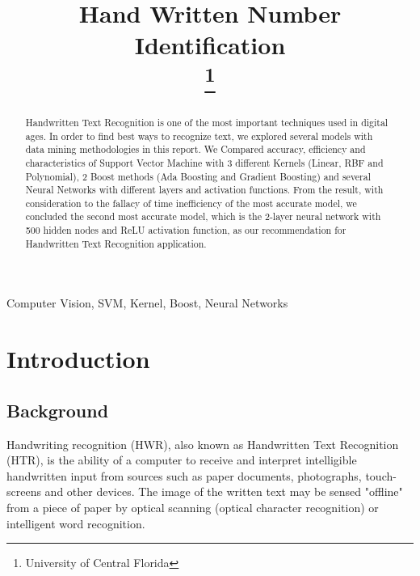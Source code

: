 \documentclass[conference]{IEEEtran}
\begin{document}
\title{Hand Written Number Identification\\
\thanks{University of Central Florida}
}

\author{
}

\maketitle
\thispagestyle{plain}
\pagestyle{plain}

\begin{abstract}
Handwritten Text Recognition is one of the most important techniques used in digital ages. In order to find best ways to recognize text, we explored several models with data mining methodologies in this report. We Compared accuracy, efficiency and characteristics of Support Vector Machine with 3 different Kernels (Linear, RBF and Polynomial), 2 Boost methods (Ada Boosting and Gradient Boosting) and several Neural Networks with different layers and activation functions. From the result, with consideration to the fallacy of time inefficiency of the most accurate model, we concluded the second most accurate model, which is the 2-layer neural network with 500 hidden nodes and ReLU activation function, as our recommendation for Handwritten Text Recognition application.
\end{abstract}

\begin{IEEEkeywords}
Computer Vision, SVM, Kernel, Boost, Neural Networks
\end{IEEEkeywords}


\section{Introduction}
\subsection{Background}
Handwriting recognition (HWR), also known as Handwritten Text Recognition (HTR), is the ability of a computer to receive and interpret intelligible handwritten input from sources such as paper documents, photographs, touch-screens and other devices. The image of the written text may be sensed "offline" from a piece of paper by optical scanning (optical character recognition) or intelligent word recognition. 
\end{document}
